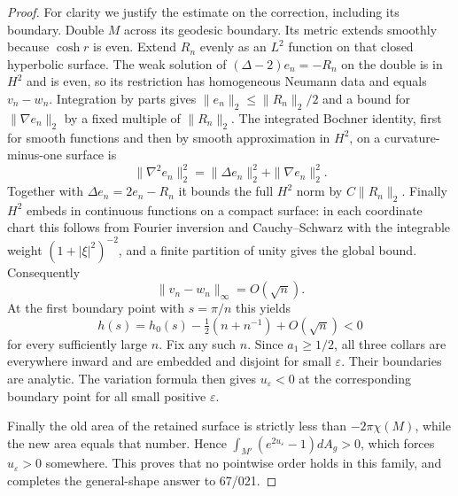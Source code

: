 \begin{proof}
For clarity we justify the estimate on the correction, including its boundary. Double $M$ across its geodesic boundary. Its metric extends smoothly because $\cosh r$ is even. Extend $R_n$ evenly as an $L^2$ function on that closed hyperbolic surface. The weak solution of
$(\Delta-2)e_n=-R_n$ on the double is in $H^2$ and is even, so its restriction has homogeneous Neumann data and equals $v_n-w_n$. Integration by parts gives $\|e_n\|_2\le\|R_n\|_2/2$ and a bound for $\|\nabla e_n\|_2$ by a fixed multiple of $\|R_n\|_2$. The integrated Bochner identity, first for smooth functions and then by smooth approximation in $H^2$, on a curvature-minus-one surface is
\[
 \|\nabla^2e_n\|_2^2=\|\Delta e_n\|_2^2+\|\nabla e_n\|_2^2.
\]
Together with $\Delta e_n=2e_n-R_n$ it bounds the full $H^2$ norm by $C\|R_n\|_2$. Finally $H^2$ embeds in continuous functions on a compact surface: in each coordinate chart this follows from Fourier inversion and Cauchy--Schwarz with the integrable weight $(1+|\xi|^2)^{-2}$, and a finite partition of unity gives the global bound. Consequently
\[
 \|v_n-w_n\|_\infty=O(\sqrt n).
\]
At the first boundary point with $s=\pi/n$ this yields
\[
 h(s)=h_0(s)-\tfrac12(n+n^{-1})+O(\sqrt n)<0
\]
for every sufficiently large $n$. Fix any such $n$. Since $a_1\ge1/2$, all three collars are everywhere inward and are embedded and disjoint for small $\varepsilon$. Their boundaries are analytic. The variation formula then gives $u_\varepsilon<0$ at the corresponding boundary point for all small positive $\varepsilon$.

Finally the old area of the retained surface is strictly less than $-2\pi\chi(M)$, while the new area equals that number. Hence $\int_{M'}(e^{2u_\varepsilon}-1)dA_g>0$, which forces $u_\varepsilon>0$ somewhere. This proves that no pointwise order holds in this family, and completes the general-shape answer to 67/021.
\end{proof}
